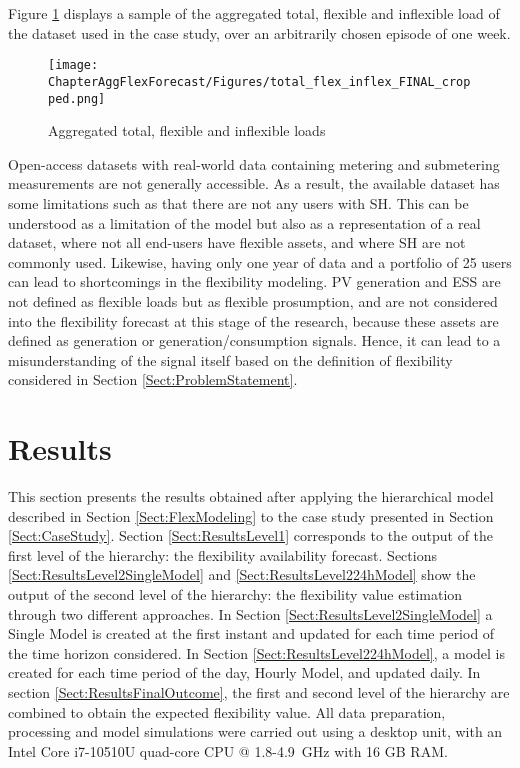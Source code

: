 Figure \ref{fig:agg_load} displays a sample of the aggregated total, flexible and inflexible load of the dataset used in the case study, over an arbitrarily chosen episode of one week. 

\begin{figure}[htbp]
\centerline{\texttt{[image: ChapterAggFlexForecast/Figures/total\_flex\_inflex\_FINAL\_cropped.png]}}
\caption{Aggregated total, flexible and inflexible loads}
\label{fig:agg_load}
\end{figure}

Open-access datasets with real-world data containing metering and submetering measurements are not generally accessible. As a result, the available dataset has some limitations such as that there are not any users with SH. This can be understood as a limitation of the model but also as a representation of a real dataset, where not all end-users have flexible assets, and where SH are not commonly used.  Likewise, having only one year of data and a portfolio of 25 users can lead to shortcomings in the flexibility modeling. PV generation and ESS are not defined as flexible loads but as flexible prosumption, and are not considered into the flexibility forecast at this stage of the research, because these assets are defined as generation or generation/consumption signals. Hence, it can lead to a misunderstanding of the signal itself based on the definition of flexibility considered in Section \ref{Sect:ProblemStatement}. 


\section{Results} \label{sect:Results} 
This section presents the results obtained after applying the hierarchical model described in Section \ref{Sect:FlexModeling} to the case study presented in Section \ref{Sect:CaseStudy}. Section \ref{Sect:ResultsLevel1} corresponds to the output of the first level of the hierarchy: the flexibility availability forecast. Sections \ref{Sect:ResultsLevel2SingleModel} and \ref{Sect:ResultsLevel224hModel} show the output of the second level of the hierarchy: the flexibility value estimation through two different approaches. In Section \ref{Sect:ResultsLevel2SingleModel} a Single Model is created at the first instant and updated for each time period of the time horizon considered. In Section \ref{Sect:ResultsLevel224hModel}, a model is created for each time period of the day, Hourly Model, and updated daily. In section \ref{Sect:ResultsFinalOutcome}, the first and second level of the hierarchy are combined to obtain the expected flexibility value. All data preparation, processing and model simulations were carried out using a desktop unit, with an Intel Core i7-10510U quad-core CPU @  1.8-4.9~GHz with 16 GB RAM.

